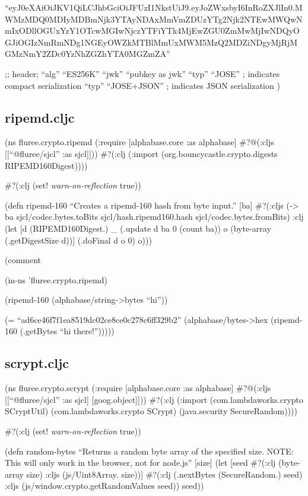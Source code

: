 \documentclass[
]{article}
\begin{document}
``eyJ0eXAiOiJKV1QiLCJhbGciOiJFUzI1NkstUiJ9.eyJoZWxsbyI6InRoZXJlIn0.MWMzMDQ0MDIyMDBmNjk3YTAyNDAxMmVmZDUzYTg2Njk2NTEwMWQwNmIxODllOGUxYzY1OTcwMGIwNjczYTFiYTk4MjEwZGU0ZmMwMjIwNDQyOGJiOGIzNmRmNDg1NGEyOWZkMTBlMmUxMWM5MzQ2MDZiNDgyMjRjMGMzNmY2ZDc0YzNhZGZhYTA0MGZmZA''

;; header; ``alg'' ``ES256K'' ``jwk'' ``pubkey as jwk'' ``typ'' ``JOSE''
; indicates compact serialization ``typ'' ``JOSE+JSON'' ; indicates JSON
serialization )

\subsection{ripemd.cljc}\label{ripemd.cljc}

(ns fluree.crypto.ripemd (:require {[}alphabase.core :as alphabase{]}
\#?@(:cljs {[}{[}``@fluree/sjcl'' :as sjcl{]}{]})) \#?(:clj (:import
(org.bouncycastle.crypto.digests RIPEMD160Digest))))

\#?(:clj (set! \emph{warn-on-reflection} true))

(defn ripemd-160 ``Creates a ripemd-160 hash from byte input.'' {[}ba{]}
\#?(:cljs (-\textgreater{} ba sjcl/codec.bytes.toBits
sjcl/hash.ripemd160.hash sjcl/codec.bytes.fromBits) :clj (let {[}d
(RIPEMD160Digest.) \_ (.update d ba 0 (count ba)) o (byte-array
(.getDigestSize d)){]} (.doFinal d o 0) o)))

(comment

(in-ns 'fluree.crypto.ripemd)

(ripemd-160 (alphabase/string-\textgreater bytes ``hi''))

(= ``ad6ce46f7f1ea8519dc02ce8ce0c278c6ff329b2''
(alphabase/bytes-\textgreater hex (ripemd-160 (.getBytes ``hi
there!'')))))

\subsection{scrypt.cljc}\label{scrypt.cljc}

(ns fluree.crypto.scrypt (:require {[}alphabase.core :as alphabase{]}
\#?@(:cljs {[}{[}``@fluree/sjcl'' :as sjcl{]} {[}goog.object{]}{]}))
\#?(:clj (:import (com.lambdaworks.crypto SCryptUtil)
(com.lambdaworks.crypto SCrypt) (java.security SecureRandom))))

\#?(:clj (set! \emph{warn-on-reflection} true))

(defn random-bytes ``Returns a random byte array of the specified size.
NOTE: This will only work in the browser, not for node.js'' {[}size{]}
(let {[}seed \#?(:clj (byte-array size) :cljs (js/Uint8Array. size)){]}
\#?(:clj (.nextBytes (SecureRandom.) seed) :cljs
(js/window.crypto.getRandomValues seed)) seed))
\end{document}
